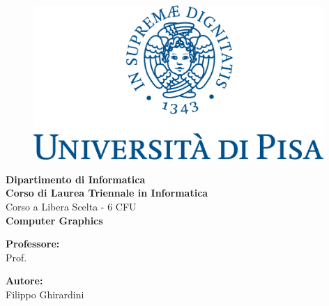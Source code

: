 \begin{titlepage} %
	\begin{figure}[t] %
		\centering\includegraphics[width=0.98\textwidth]{marchio_unipi_pant541.png}
	\end{figure}
	\vspace{20mm}
	
	\begin{Large}
		\begin{center}
			\textbf{Dipartimento di Informatica\\ Corso di Laurea Triennale in Informatica\\}
			\vspace{20mm}
			{\LARGE{Corso a Libera Scelta - 6 CFU}}\\
			\vspace{10mm}
			{\huge{\bf Computer Graphics}}\\
		\end{center}
	\end{Large}
	
	
	\vspace{36mm}
	\begin{minipage}[t]{0.47\textwidth}
		{\large{\bf Professore:}\\ \large{Prof. }}
	\end{minipage}
	\hfill
	\begin{minipage}[t]{0.47\textwidth}\raggedleft
		{\large{\bf Autore:}\\ \large{Filippo Ghirardini}}
	\end{minipage}
	
	\vspace{25mm}
	
	\hrulefill
	
	\vspace{5mm}
	
	
\end{titlepage}